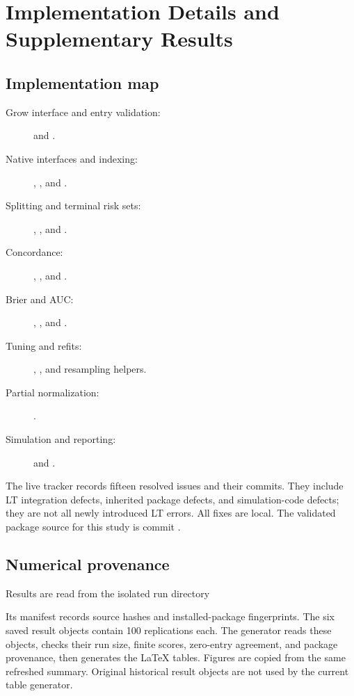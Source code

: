\chapter{Implementation Details and Supplementary Results}\label{app:code}
\section{Implementation map}
\begin{description}
\item[Grow interface and entry validation:]  and
.
\item[Native interfaces and indexing:] ,
, and .
\item[Splitting and terminal risk sets:] ,
, and .
\item[Concordance:] , ,
and .
\item[Brier and AUC:] ,
, and .
\item[Tuning and refits:] ,
, and resampling helpers.
\item[Partial normalization:] .
\item[Simulation and reporting:] 
and .
\end{description}

The live tracker  records fifteen resolved issues and
their commits. They include LT integration defects, inherited package
defects, and simulation-code defects; they are not all newly introduced
LT errors. All fixes are local. The validated package source for this
study is commit \RunCommit{}.

\section{Numerical provenance}
Results are read from the isolated run directory
\begin{center}
\end{center}
Its manifest records source hashes and installed-package fingerprints.
The six saved result objects contain 100 replications each. The
generator  reads these
objects, checks their run size, finite scores, zero-entry agreement,
and package provenance, then generates the LaTeX tables. Figures are
copied from the same refreshed summary. Original historical result
objects are not used by the current table generator.

